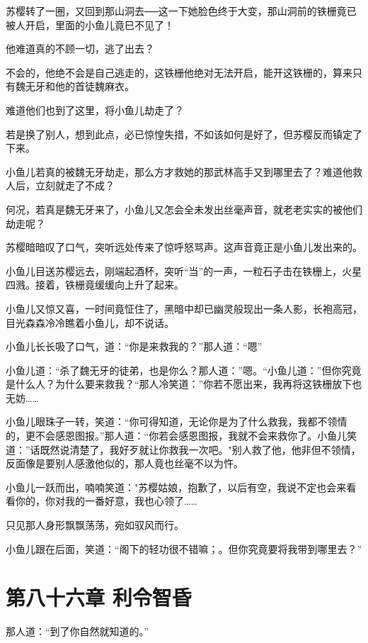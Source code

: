 \documentclass[12pt,oneside]{book}
\begin{document}
苏樱转了一圈，又回到那山洞去──这一下她脸色终于大变，那山洞前的铁栅竟已被人开启，里面的小鱼儿竟巳不见了！

他难道真的不顾一切，逃了出去？

不会的，他绝不会是自己逃走的，这铁栅他绝对无法开启，能开这铁栅的，算来只有魏无牙和他的首徒魏麻衣。

难道他们也到了这里，将小鱼儿劫走了？

若是换了别人，想到此点，必已惊惶失措，不如该如何是好了，但苏樱反而镇定了下来。

小鱼儿若真的被魏无牙劫走，那么方才救她的那武林高手又到哪里去了？难道他救人后，立刻就走了不成？

何况，若真是魏无牙来了，小鱼儿又怎会全未发出丝毫声音，就老老实实的被他们劫走呢？

苏樱暗暗叹了口气，突听远处传来了惊呼怒骂声。这声音竟正是小鱼儿发出来的。

小鱼儿目送苏樱远去，刚端起酒杯，突听``当''的一声，一粒石子击在铁栅上，火星四溅。接着，铁栅竟缓缓向上升了起来。

小鱼儿又惊又喜，一时间竟怔住了，黑暗中却已幽灵般现出一条人影，长袍高冠，目光森森冷冷瞧着小鱼儿，却不说话。

小鱼儿长长吸了口气，道：``你是来救我的？''那人道：``嗯''

小鱼儿道：``杀了魏无牙的徒弟，也是你么？那人道：''嗯。``小鱼儿道：''但你究竟是什么人？为什么要来救我？``那人冷笑道：''你若不愿出来，我再将这铁栅放下也无妨\ldots\ldots{}

小鱼儿眼珠子一转，笑道：``你可得知道，无论你是为了什么救我，我都不领情的，更不会感恩图报。''那人道：``你若会感恩图报，我就不会来救你了。小鱼儿笑道：''话既然说清楚了，我好歹就让你救我一次吧。"别人救了他，他非但不领情，反面像是要别人感激他似的，那人竟也丝毫不以为忤。

小鱼儿一跃而出，喃喃笑道："苏樱姑娘，抱歉了，以后有空，我说不定也会来看看你的，你对我的一番好意，我也心领了\ldots\ldots{}

只见那人身形飘飘荡荡，宛如驭风而行。

小鱼儿跟在后面，笑道：``阁下的轻功很不错嘛；。但你究竟要将我带到哪里去？''

\hypertarget{ux7b2cux516bux5341ux516dux7ae0-ux5229ux4ee4ux667aux660f}{%
\chapter{第八十六章
利令智昏}\label{ux7b2cux516bux5341ux516dux7ae0-ux5229ux4ee4ux667aux660f}}

那人道：``到了你自然就知道的。''
\end{document}
